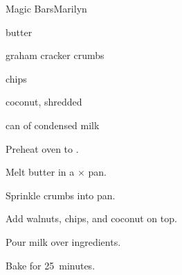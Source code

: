 \begin{recipe}{Magic Bars}{Marilyn}{}

\begin{ingredients}
\item \C{\half} butter
\item \C{1\half} graham cracker crumbs
\item {} 
\item {}  chips
\item \C{1\half} coconut, shredded
\item can of condensed milk
\end{ingredients}

\begin{directions}
\item Preheat oven to .
\item Melt butter in a $\times$ pan.
\item Sprinkle crumbs into pan.
\item Add walnuts, chips, and coconut on top.
\item Pour milk over ingredients.
\item Bake for 25~minutes.
\end{directions}

\end{recipe}
